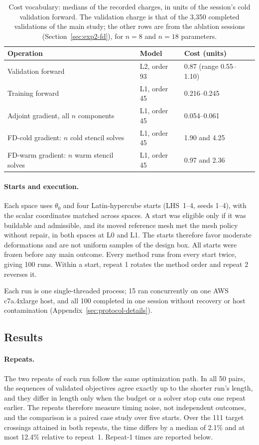 \begin{table}[H]\centering\small
\caption{Cost vocabulary: medians of the recorded charges, in units of
the session's cold validation forward. The validation charge is that of
the 3,350 completed validations of the main study; the other rows are
from the ablation sessions (Section~\ref{sec:exp2-fd}), for $n=8$ and
$n=18$ parameters.}
\label{tab:costs}
\begin{tabular}{lll}\toprule
Operation & Model & Cost (units)\\\midrule
Validation forward & L2, order 93 & 0.87 (range 0.55--1.10)\\
Training forward & L1, order 45 & 0.216--0.245\\
Adjoint gradient, all $n$ components & L1, order 45 & 0.054--0.061\\
FD-cold gradient: $n$ cold stencil solves & L1, order 45 & 1.90 and 4.25\\
FD-warm gradient: $n$ warm stencil solves & L1, order 45 & 0.97 and 2.36\\\bottomrule
\end{tabular}
\end{table}

\paragraph{Starts and execution.}
Each space uses $\theta_0$ and four Latin-hypercube starts (LHS~1--4, seeds 1--4),
with the scalar coordinates matched across spaces. A start was eligible
only if it was buildable and admissible, and its moved reference mesh met
the mesh policy without repair, in both spaces at L0 and L1. The starts
therefore favor moderate deformations and are not uniform samples of the
design box. All starts were frozen before any main outcome. Every method
runs from every start twice, giving 100 runs. Within a start, repeat 1
rotates the method order and repeat 2 reverses it.

Each run is one single-threaded process; 15 ran concurrently on one AWS
c7a.4xlarge host, and all 100 completed in one session without recovery or
host contamination (Appendix~\ref{sec:protocol-details}).

\subsection{Results}\label{sec:exp2-results}
\paragraph{Repeats.}
The two repeats of each run follow the same optimization path. In all 50
pairs, the sequences of validated objectives agree exactly up to the
shorter run's length, and they differ in length only when the budget or a
solver stop cuts one repeat earlier. The repeats therefore measure timing
noise, not independent outcomes, and the comparison is a paired case study
over five starts. Over the 111 target crossings attained in both repeats,
the time differs by a median of 2.1\% and at most 12.4\% relative to
repeat~1. Repeat-1 times are reported below.

